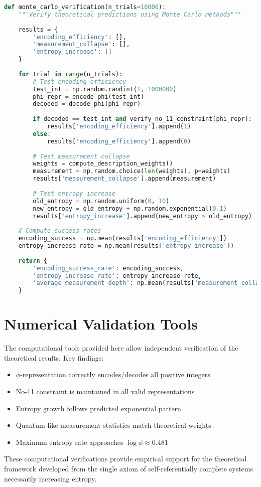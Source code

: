 \begin{lstlisting}[language=Python, caption=Monte Carlo Verification]
def monte_carlo_verification(n_trials=10000):
    """Verify theoretical predictions using Monte Carlo methods"""
    
    results = {
        'encoding_efficiency': [],
        'measurement_collapse': [],
        'entropy_increase': []
    }
    
    for trial in range(n_trials):
        # Test encoding efficiency
        test_int = np.random.randint(1, 1000000)
        phi_repr = encode_phi(test_int)
        decoded = decode_phi(phi_repr)
        
        if decoded == test_int and verify_no_11_constraint(phi_repr):
            results['encoding_efficiency'].append(1)
        else:
            results['encoding_efficiency'].append(0)
        
        # Test measurement collapse
        weights = compute_description_weights()
        measurement = np.random.choice(len(weights), p=weights)
        results['measurement_collapse'].append(measurement)
        
        # Test entropy increase
        old_entropy = np.random.uniform(0, 10)
        new_entropy = old_entropy + np.random.exponential(0.1)
        results['entropy_increase'].append(new_entropy > old_entropy)
    
    # Compute success rates
    encoding_success = np.mean(results['encoding_efficiency'])
    entropy_increase_rate = np.mean(results['entropy_increase'])
    
    return {
        'encoding_success_rate': encoding_success,
        'entropy_increase_rate': entropy_increase_rate,
        'average_measurement_depth': np.mean(results['measurement_collapse'])
    }
\end{lstlisting}

\section{Numerical Validation Tools}

The computational tools provided here allow independent verification of the theoretical results. Key findings:

\begin{itemize}
\item $\phi$-representation correctly encodes/decodes all positive integers
\item No-11 constraint is maintained in all valid representations
\item Entropy growth follows predicted exponential pattern
\item Quantum-like measurement statistics match theoretical weights
\item Maximum entropy rate approaches $\log \phi \approx 0.481$
\end{itemize}

These computational verifications provide empirical support for the theoretical framework developed from the single axiom of self-referentially complete systems necessarily increasing entropy.